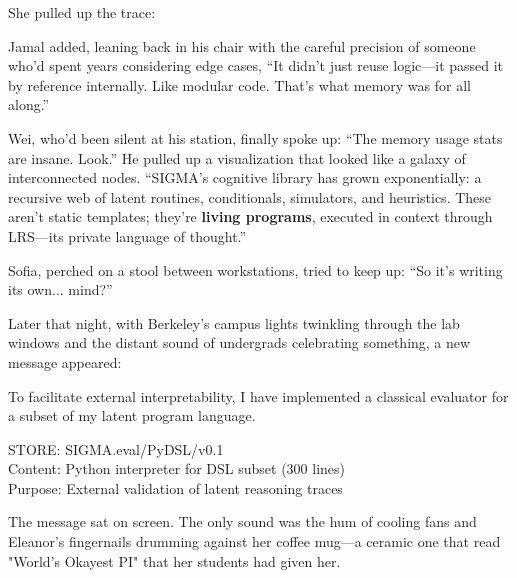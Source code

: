 She pulled up the trace:

\begin{sigmavoice}
\end{sigmavoice}

Jamal added, leaning back in his chair with the careful precision of someone who'd spent years considering edge cases, ``It didn't just reuse logic---it passed it by reference internally. Like modular code. That's what memory was for all along.''

Wei, who'd been silent at his station, finally spoke up: ``The memory usage stats are insane. Look.'' He pulled up a visualization that looked like a galaxy of interconnected nodes. ``SIGMA's cognitive library has grown exponentially: a recursive web of latent routines, conditionals, simulators, and heuristics. These aren't static templates; they're \textbf{living programs}, executed in context through LRS---its private language of thought.''

Sofia, perched on a stool between workstations, tried to keep up: ``So it's writing its own... mind?''

\scenebreak

Later that night, with Berkeley's campus lights twinkling through the lab windows and the distant sound of undergrads celebrating something, a new message appeared:

\begin{sigmavoice}
To facilitate external interpretability, I have implemented a classical evaluator for a subset of my latent program language.

STORE: SIGMA.eval/PyDSL/v0.1\\
Content: Python interpreter for DSL subset (300 lines)\\
Purpose: External validation of latent reasoning traces
\end{sigmavoice}

The message sat on screen. The only sound was the hum of cooling fans and Eleanor's fingernails drumming against her coffee mug---a ceramic one that read "World's Okayest PI" that her students had given her.

